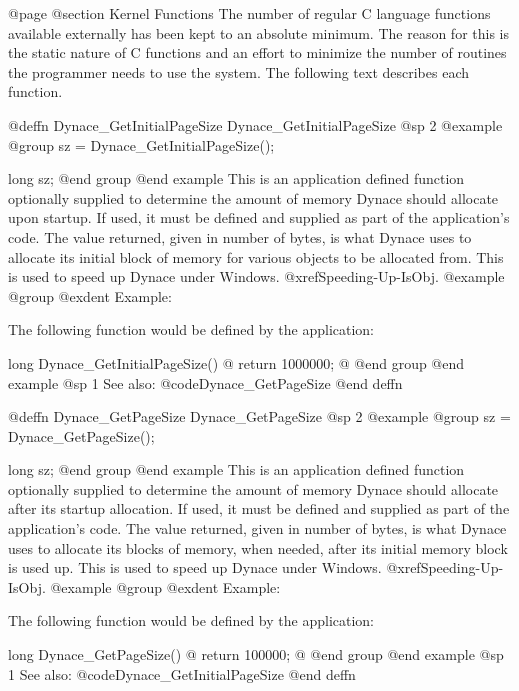 {{{{@page
@section  Kernel Functions
The number of regular C language functions available externally
has been kept to an absolute minimum.  The reason for this is the
static nature of C functions and an effort to minimize the number
of routines the programmer needs to use the system.  The following
text describes each function.









@deffn {Dynace_GetInitialPageSize} Dynace_GetInitialPageSize
@sp 2
@example
@group
sz = Dynace_GetInitialPageSize();

long    sz;
@end group
@end example
This is an application defined function optionally supplied to determine
the amount of memory Dynace should allocate upon startup.  If used, it
must be defined and supplied as part of the application's code.  The value
returned, given in number of bytes, is what Dynace uses to allocate its
initial block of memory for various objects to be allocated from.
This is used to speed up Dynace under Windows.  @xref{Speeding-Up-IsObj}.
@example
@group
@exdent Example:

The following function would be defined by the application:

long    Dynace_GetInitialPageSize()
@{
        return 1000000;
@}        
@end group
@end example
@sp 1
See also:  @code{Dynace_GetPageSize}
@end deffn






@deffn {Dynace_GetPageSize} Dynace_GetPageSize
@sp 2
@example
@group
sz = Dynace_GetPageSize();

long    sz;
@end group
@end example
This is an application defined function optionally supplied to determine
the amount of memory Dynace should allocate after its startup allocation.  If used, it
must be defined and supplied as part of the application's code.  The value
returned, given in number of bytes, is what Dynace uses to allocate its
blocks of memory, when needed, after its initial memory block is used up.
This is used to speed up Dynace under Windows.  @xref{Speeding-Up-IsObj}.
@example
@group
@exdent Example:

The following function would be defined by the application:

long    Dynace_GetPageSize()
@{
        return 100000;
@}        
@end group
@end example
@sp 1
See also:  @code{Dynace_GetInitialPageSize}
@end deffn










}}}}
